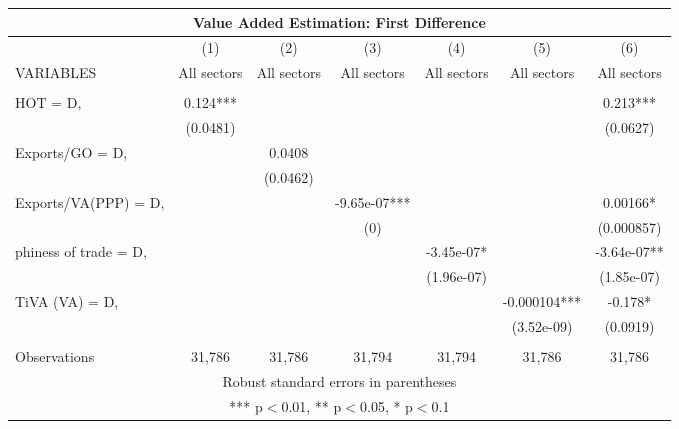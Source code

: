 \documentclass[]{article}
\begin{document}
\begin{tabular}{lcccccc}
\multicolumn{7}{c}{Value Added Estimation: First Difference} \\ \hline
 & (1) & (2) & (3) & (4) & (5) & (6) \\
VARIABLES & All sectors & All sectors & All sectors & All sectors & All sectors & All sectors \\ \hline
 &  &  &  &  &  &  \\
HOT = D, & 0.124*** &  &  &  &  & 0.213*** \\
 & (0.0481) &  &  &  &  & (0.0627) \\
Exports/GO = D, &  & 0.0408 &  &  &  &  \\
 &  & (0.0462) &  &  &  &  \\
Exports/VA(PPP) = D, &  &  & -9.65e-07*** &  &  & 0.00166* \\
 &  &  & (0) &  &  & (0.000857) \\
phiness of trade = D, &  &  &  & -3.45e-07* &  & -3.64e-07** \\
 &  &  &  & (1.96e-07) &  & (1.85e-07) \\
TiVA (VA) = D, &  &  &  &  & -0.000104*** & -0.178* \\
 &  &  &  &  & (3.52e-09) & (0.0919) \\
 &  &  &  &  &  &  \\
 Observations & 31,786 & 31,786 & 31,794 & 31,794 & 31,786 & 31,786 \\ \hline
\multicolumn{7}{c}{ Robust standard errors in parentheses} \\
\multicolumn{7}{c}{ *** p$<$0.01, ** p$<$0.05, * p$<$0.1} \\
\end{tabular}
\end{document}
